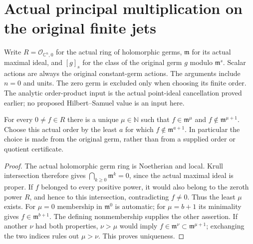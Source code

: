 \section{Actual principal multiplication on the original finite jets}

Write $R=\mathcal O_{\mathbb C^n,0}$ for the actual ring of holomorphic
germs, $\mathfrak m$ for its actual maximal ideal, and $[g]_s$ for the
class of the original germ $g$ modulo $\mathfrak m^s$. Scalar actions are
always the original constant-germ actions. The arguments include $n=0$
and units. The zero germ is excluded only when choosing its finite order.
The analytic order-product input is the actual point-ideal cancellation
proved earlier; no proposed Hilbert--Samuel value is an input here.

\begin{lemma}
\label{hir:actual-nonzero-holomorphic-germ-finite-order}
\leanok
{}
For every $0\ne f\in R$ there is a unique $\mu\in\mathbb N$ such that
$f\in\mathfrak m^\mu$ and $f\notin\mathfrak m^{\mu+1}$.
Choose this actual order by the least $a$ for which
$f\notin\mathfrak m^{a+1}$. In particular the choice is made from the
original germ, rather than from a supplied order or quotient certificate.
\end{lemma}
\begin{proof}
The actual holomorphic germ ring is Noetherian and local. Krull intersection
therefore gives $\bigcap_{k\ge0}\mathfrak m^k=0$, since the actual maximal
ideal is proper. If $f$ belonged to every positive power, it would also
belong to the zeroth power $R$, and hence to this intersection, contradicting
$f\ne0$. Thus the least $\mu$ exists. For $\mu=0$ membership in
$\mathfrak m^0$ is automatic; for $\mu=b+1$ its minimality gives
$f\in\mathfrak m^{b+1}$. The defining nonmembership supplies the other
assertion. If another $\nu$ had both properties, $\nu>\mu$ would imply
$f\in\mathfrak m^\nu\subset\mathfrak m^{\mu+1}$; exchanging the two
indices rules out $\mu>\nu$. This proves uniqueness.
\end{proof}

